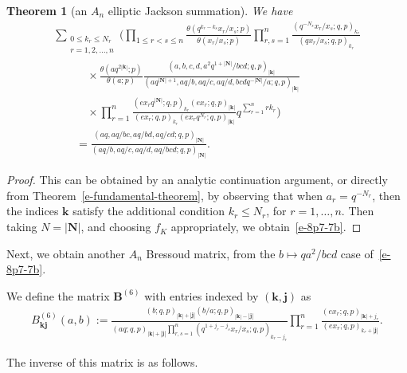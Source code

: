 \documentclass[pdftex]{sigma}
\numberwithin{equation}{section}
\newtheorem{Theorem}{Theorem}[section]
\newcommand{\sumN}{{\left| \boldsymbol{N} \right|}}
\newcommand\sumj{{\left| \boldsymbol {j} \right|}}
\newcommand\sumk{{\left| \boldsymbol{k} \right|}}
\newcommand{\B}{{ \mathbf B}}
\renewcommand{\k}{{ \boldsymbol{k}}}
\renewcommand{\j}{{ \boldsymbol{j}}}
\newcommand{\multsum}[3]{{\sum\limits_{\substack{{0\le #1_#3 \le #2_#3} \\
{#3 =1,2,\dots, n}}}}}
\newcommand{\triprod}[1]{\prod\limits_{1\le r < s \le #1}}
\newcommand{\sqprod}[1]{\prod\limits_{r, s =1}^{#1}} %
\newcommand{\smallprod}[1]{\prod\limits_{r =1}^{#1}} %
\newcommand{\xover}[1]{#1_{r}/#1_{s}}
\newcommand{\ellipticqrfac}[2]{{\left({#1}; q, p\right)_{#2}}} %
\newcommand{\elliptictheta}[1]{\theta \left({#1} ; p\right) }
\newcommand{\ellipticvandermonde}[3]{\triprod{#3} %
\!\! \frac{\elliptictheta{q^{#2_r-#2_s} \xover {#1} }}{\elliptictheta{\xover{#1}}}
}
\begin{document}
\begin{Theorem}[an $A_n$ elliptic Jackson summation]\label{th:e-8p7-7b} We have
\begin{gather}
\multsum{k}{N}{r}
 \Bigg(\ellipticvandermonde{x}{k}{n}
\sqprod n \frac{\ellipticqrfac{q^{-N_s}\xover{x}}{k_r} }{\ellipticqrfac{q\xover{x}}{k_r} } \nonumber\\
\qquad\quad{}\times \frac {\elliptictheta{aq^{2\sumk}}} {\elliptictheta{a}}
\frac{\ellipticqrfac{a, b, c, d, a^2q^{1+\sumN}/b c d}{\sumk}}{\ellipticqrfac{aq^{\sumN+1}, aq/b , aq/c, aq/d, b c dq^{-\sumN}/a}{\sumk}}
\nonumber\\
\qquad\quad{} \times \smallprod n \frac{\ellipticqrfac{ex_rq^{\sumN}}{k_r}
\ellipticqrfac{ex_r}{\sumk}}{\ellipticqrfac{ex_r}{k_r} \ellipticqrfac{ex_rq^{N_r}}{\sumk}}q^{\sum\limits_{r=1}^n rk_r} \Bigg)\nonumber\\
\qquad{} = \frac{\ellipticqrfac{aq, aq/b c, aq/b d, aq/cd}{\sumN}}{\ellipticqrfac{aq/b , aq/c, aq/d, aq/b c d}{\sumN}} .\label{e-8p7-7b}
\end{gather}
\end{Theorem}
\begin{proof} This can be obtained by an analytic continuation argument, or directly from Theorem~\ref{e-fundamental-theorem}, by observing that when $a_r=q^{-N_r}$, then the indices $\k$ satisfy the additional condition $k_r\leq N_r$, for $r=1, \dots, n$. Then taking $N=\sumN$, and choosing $f_K$ appropriately, we obtain~\eqref{e-8p7-7b}.
\end{proof}

Next, we obtain another $A_n$ Bressoud matrix, from the $b\mapsto qa^2/bcd$ case of~\eqref{e-8p7-7b}.
\begin{Definition} We define the matrix $\B^{(6)}$ with entries indexed by $(\k , \j)$ as
\begin{gather}
B^{(6)}_{\k \j}(a,b) := \frac{\ellipticqrfac{b}{\sumk+\sumj} \ellipticqrfac{b/a}{\sumk-\sumj}}
{ \ellipticqrfac{aq}{\sumk+\sumj} \sqprod n \ellipticqrfac{q^{1+j_r-j_s}\xover x }{k_r-j_r} }
 \smallprod n \frac{\ellipticqrfac{ex_r}{\sumk+j_r}} {\ellipticqrfac{ex_r}{k_r+\sumj}}. \label{e-B6}
\end{gather}
\end{Definition}

The inverse of this matrix is as follows.
\end{document}
